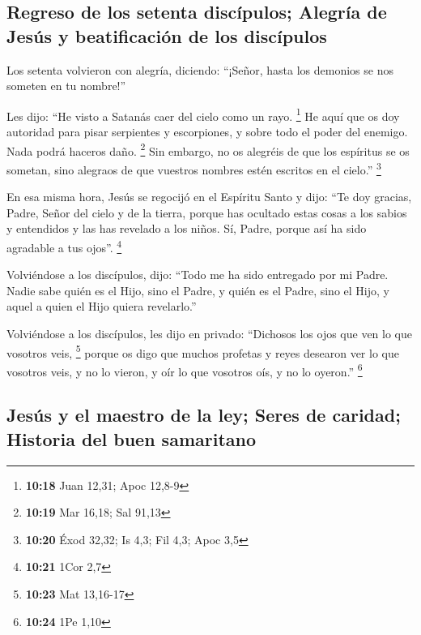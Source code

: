 \hypertarget{regreso-de-los-setenta-discuxedpulos-alegruxeda-de-jesuxfas-y-beatificaciuxf3n-de-los-discuxedpulos}{%
\subsection{Regreso de los setenta discípulos; Alegría de Jesús y
beatificación de los
discípulos}\label{regreso-de-los-setenta-discuxedpulos-alegruxeda-de-jesuxfas-y-beatificaciuxf3n-de-los-discuxedpulos}}

 Los setenta volvieron con alegría, diciendo: ``¡Señor,
hasta los demonios se nos someten en tu nombre!''

 Les dijo: ``He visto a Satanás caer del cielo como un
rayo. \footnote{\textbf{10:18} Juan 12,31; Apoc 12,8-9} 
He aquí que os doy autoridad para pisar serpientes y escorpiones, y
sobre todo el poder del enemigo. Nada podrá haceros daño. \footnote{\textbf{10:19}
  Mar 16,18; Sal 91,13}  Sin embargo, no os alegréis de
que los espíritus se os sometan, sino alegraos de que vuestros nombres
estén escritos en el cielo.'' \footnote{\textbf{10:20} Éxod 32,32; Is
  4,3; Fil 4,3; Apoc 3,5}

 En esa misma hora, Jesús se regocijó en el Espíritu
Santo y dijo: ``Te doy gracias, Padre, Señor del cielo y de la tierra,
porque has ocultado estas cosas a los sabios y entendidos y las has
revelado a los niños. Sí, Padre, porque así ha sido agradable a tus
ojos''. \footnote{\textbf{10:21} 1Cor 2,7}

 Volviéndose a los discípulos, dijo: ``Todo me ha sido
entregado por mi Padre. Nadie sabe quién es el Hijo, sino el Padre, y
quién es el Padre, sino el Hijo, y aquel a quien el Hijo quiera
revelarlo.''

 Volviéndose a los discípulos, les dijo en privado:
``Dichosos los ojos que ven lo que vosotros veis, \footnote{\textbf{10:23}
  Mat 13,16-17}  porque os digo que muchos profetas y
reyes desearon ver lo que vosotros veis, y no lo vieron, y oír lo que
vosotros oís, y no lo oyeron.'' \footnote{\textbf{10:24} 1Pe 1,10}

\hypertarget{jesuxfas-y-el-maestro-de-la-ley-seres-de-caridad-historia-del-buen-samaritano}{%
\subsection{Jesús y el maestro de la ley; Seres de caridad; Historia del
buen
samaritano}\label{jesuxfas-y-el-maestro-de-la-ley-seres-de-caridad-historia-del-buen-samaritano}}

